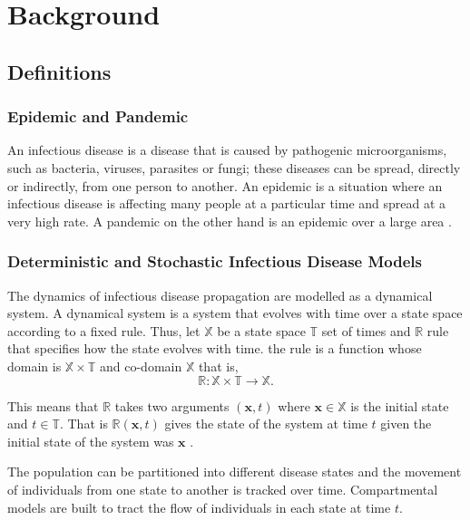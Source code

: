 \chapter{Background}

\section{Definitions}
\subsection{Epidemic and Pandemic }
An infectious disease is a disease that is caused by pathogenic microorganisms, such as bacteria, viruses, parasites or fungi; these diseases can be spread, directly or indirectly, from one person to another. An epidemic is a situation where an infectious disease is affecting many people at a particular time and spread at a very high rate. A pandemic on the other hand
is an epidemic over a large area \citep{morens2009pandemic}.

\subsection{Deterministic and Stochastic Infectious Disease Models}
The dynamics of infectious disease propagation are modelled as a dynamical system. A dynamical system is a system that evolves with time over a state space according to a fixed rule. Thus, let $\mathbb{X}$ be a state space $\mathbb{T}$ set of times and $\mathbb{R}$ rule that specifies how the state evolves with time. the rule is a function  whose domain is $\mathbb{X} \times  \mathbb{T}$ and co-domain $\mathbb{X}$ that is,
\begin{equation*}
\mathbb{R}: \mathbb{X}  \times \mathbb{T} \longrightarrow \mathbb{X}.
\end{equation*}

This means that $\mathbb{R}$ takes two arguments $ (\textbf{x},t)$ where $\textbf{x} \in \mathbb{X}$ is the initial state and $t \in \mathbb{T}$. That is $\mathbb{R} (\textbf{x},t)$ gives the state of the system at time $t$ given the initial state of the system was $\textbf{x}$ \citep{DQ}.

The population can be partitioned into different disease states and the movement of individuals from one state to another is tracked over time. Compartmental models are built to tract the flow of individuals in each state at time $t$.


